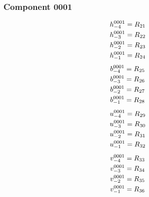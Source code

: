 \documentclass[11pt,a4paper]{article}
\begin{document}
\subsubsection{Component 0001}
\begin{equation}
\shortstack[l]{$\displaystyle h^{0001}_{-4}=R_{21}$\\
$\displaystyle h^{0001}_{-3}=R_{22}$\\
$\displaystyle h^{0001}_{-2}=R_{23}$\\
$\displaystyle h^{0001}_{-1}=R_{24}$}
\label{eq:cat-map-6}
\end{equation}
\begin{equation}
\shortstack[l]{$\displaystyle b^{0001}_{-4}=R_{25}$\\
$\displaystyle b^{0001}_{-3}=R_{26}$\\
$\displaystyle b^{0001}_{-2}=R_{27}$\\
$\displaystyle b^{0001}_{-1}=R_{28}$}
\label{eq:cat-map-7}
\end{equation}
\begin{equation}
\shortstack[l]{$\displaystyle u^{0001}_{-4}=R_{29}$\\
$\displaystyle u^{0001}_{-3}=R_{30}$\\
$\displaystyle u^{0001}_{-2}=R_{31}$\\
$\displaystyle u^{0001}_{-1}=R_{32}$}
\label{eq:cat-map-8}
\end{equation}
\begin{equation}
\shortstack[l]{$\displaystyle v^{0001}_{-4}=R_{33}$\\
$\displaystyle v^{0001}_{-3}=R_{34}$\\
$\displaystyle v^{0001}_{-2}=R_{35}$\\
$\displaystyle v^{0001}_{-1}=R_{36}$}
\label{eq:cat-map-9}
\end{equation}
\end{document}
